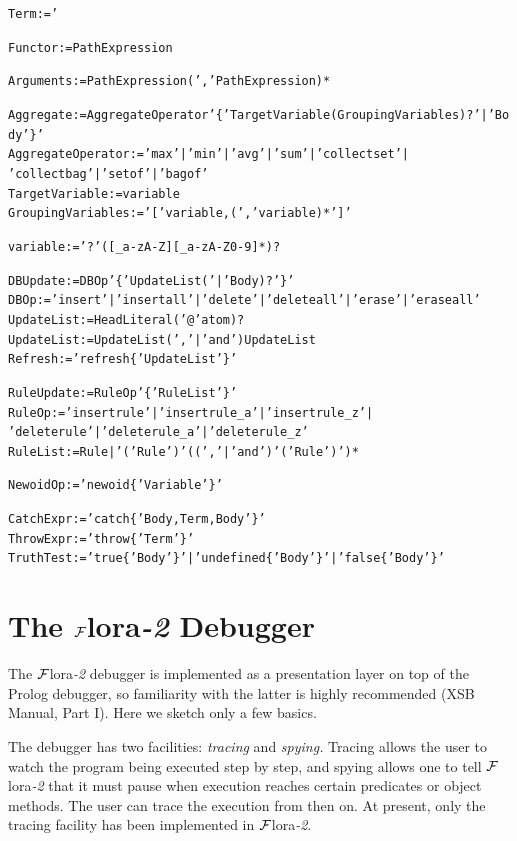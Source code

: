 \documentclass[11pt]{article}
\newcommand{\FLORA}{{\mbox{\sc ${\cal F}${lora}\rm\emph{-2}}}\xspace}
\begin{document}
\begin{alltt}
Term := '%

Functor := PathExpression

Arguments := PathExpression (',' PathExpression)*

Aggregate := AggregateOperator '\{' TargetVariable (GroupingVariables)? '|' Body '\}'
AggregateOperator := 'max' | 'min' | 'avg' | 'sum' | 'collectset' |
                             'collectbag' | 'setof' | 'bagof'
TargetVariable := variable
GroupingVariables := '[' variable, (',' variable)* ']'

variable := '?' ([_a-zA-Z][_a-zA-Z0-9]*)?

DBUpdate := DBOp '\{' UpdateList ('|' Body)? '\}'
DBOp := 'insert' | 'insertall' | 'delete' | 'deleteall' | 'erase' | 'eraseall'
UpdateList := HeadLiteral ('@' atom)?
UpdateList := UpdateList (',' | 'and') UpdateList
Refresh := 'refresh\{' UpdateList '\}'

RuleUpdate := RuleOp '\{' RuleList '\}'
RuleOp := 'insertrule' | 'insertrule_a' | 'insertrule_z' |
               'deleterule' | 'deleterule_a' | 'deleterule_z'
RuleList := Rule | '(' Rule ')'  ( (',' | 'and')  '(' Rule ')' )*

NewoidOp := 'newoid\{' Variable '\}'

CatchExpr := 'catch\{' Body, Term, Body '\}'
ThrowExpr := 'throw\{' Term '\}'
TruthTest := 'true\{' Body '\}' | 'undefined\{' Body '\}' | 'false\{' Body '\}'
\end{alltt}


\section{The \FLORA Debugger}\label{sec-debugger}


The \FLORA debugger is implemented as a presentation layer on top of the Prolog
debugger, so familiarity with the latter is highly recommended (XSB Manual,
Part I). Here we sketch only a few basics.

The debugger has two facilities: \emph{tracing} and \emph{spying.} Tracing
allows the user to watch the program being executed step by step, and
spying allows one to tell \FLORA that it must pause when execution reaches
certain predicates or object methods. The user can trace the execution from
then on. At present, only the tracing facility has been implemented in
\FLORA.
\end{document}
